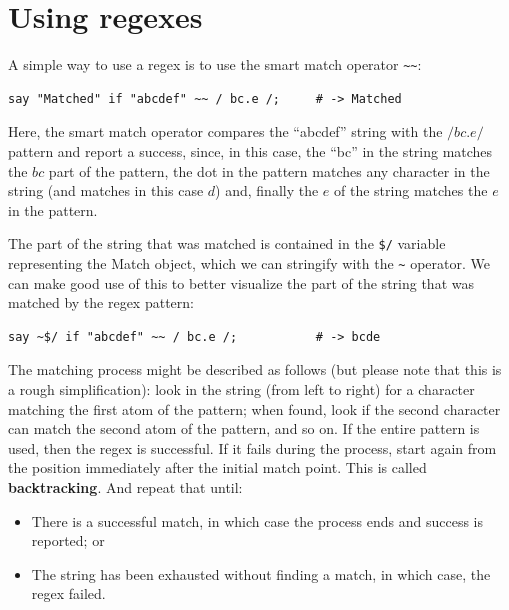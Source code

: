 \section{Using regexes}
\label{using_regexes}

A simple way to use a regex is to use the smart match operator 
\verb'~~':

\begin{verbatim}
say "Matched" if "abcdef" ~~ / bc.e /;     # -> Matched
\end{verbatim}
%

Here, the smart match operator compares the ``abcdef'' string 
with the $/bc.e/$ pattern and report a success, since, in 
this case, the ``bc'' in the string matches the $bc$ part of 
the pattern, the dot in the pattern matches any character in the string (and matches in this case $d$) and, finally the $e$ of 
the string matches the $e$ in the pattern.

The part of the string that was matched is contained in the 
\verb'$/' variable representing the Match object, which we 
can stringify with the \verb'~' operator. We can make good 
use of this to better visualize the part of the string 
that was matched by the regex pattern:

\begin{verbatim}
say ~$/ if "abcdef" ~~ / bc.e /;           # -> bcde
\end{verbatim}
%


The matching process might be described as follows (but please 
note that this is a rough simplification): look 
in the string (from left to right) for a character matching 
the first atom of the pattern; when found, look if the second 
character can match the second atom of the pattern, and so on. 
If the entire pattern is used, then the regex is successful.
If it fails during the process, start again from the position 
immediately after the initial match point. This is called 
{\bf backtracking}. And repeat that until:

\begin{itemize}
\item There is a successful match, in which case the process 
ends and success is reported; or 
\item The string has been exhausted without finding a match, 
in which case, the regex failed.
\end{itemize}

